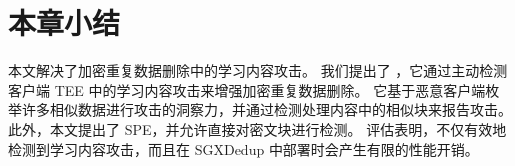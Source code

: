 \section{本章小结}
\label{sec:conclusion}
本文解决了加密重复数据删除中的学习内容攻击。 我们提出了 \sysnameF，它通过主动检测客户端 TEE 中的学习内容攻击来增强加密重复数据删除。 它基于恶意客户端枚举许多相似数据进行攻击的洞察力，并通过检测处理内容中的相似块来报告攻击。 此外，本文提出了 SPE，并允许直接对密文块进行检测。 评估表明，\sysnameF 不仅有效地检测到学习内容攻击，而且在 SGXDedup \cite{ren21} 中部署时会产生有限的性能开销。

